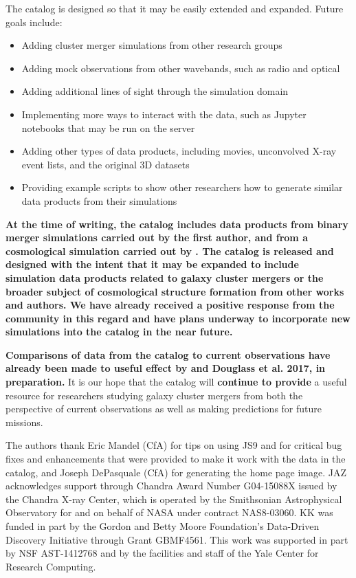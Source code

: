 \documentclass{emulateapj}
\begin{document}
The catalog is designed so that it may be easily extended and expanded. Future goals include:

\begin{itemize}
\item Adding cluster merger simulations from other research groups
\item Adding mock observations from other wavebands, such as radio and optical
\item Adding additional lines of sight through the simulation domain
\item Implementing more ways to interact with the data, such as Jupyter notebooks that may be run on the server
\item Adding other types of data products, including movies, unconvolved X-ray event lists, and the original 3D datasets
\item Providing example scripts to show other researchers how to generate similar data products from their simulations
\end{itemize}

\textbf{At the time of writing, the catalog includes data products from binary merger simulations carried out by the first author, and from a cosmological simulation carried out by \citet{nel14}. The catalog is released and designed with the intent that it may be expanded to include simulation data products related to galaxy cluster mergers or the broader subject of cosmological structure formation from other works and authors. We have already received a positive response from the community in this regard and have plans underway to incorporate new simulations into the catalog in the near future.}

{\bf Comparisons of data from the catalog to current observations have already been made to useful effect by \citet{wal17} and Douglass et al. 2017, in preparation.} It is our hope that the catalog will {\bf continue to provide} a useful resource for researchers studying galaxy cluster mergers from both the perspective of current observations as well as making predictions for future missions. 

\acknowledgements
The authors thank Eric Mandel (CfA) for tips on using JS9 and for critical bug fixes and enhancements that were provided to make it work with the data in the catalog, and Joseph DePasquale (CfA) for generating the home page image. JAZ acknowledges support through Chandra Award Number G04-15088X issued by the Chandra X-ray Center, which is operated by the Smithsonian Astrophysical Observatory for and on behalf of NASA under contract NAS8-03060. KK was funded in part by the Gordon and Betty Moore Foundation's Data-Driven Discovery Initiative through Grant GBMF4561. This work was supported in part by NSF AST-1412768 and by the facilities and staff of the Yale Center for Research Computing.
\end{document}

